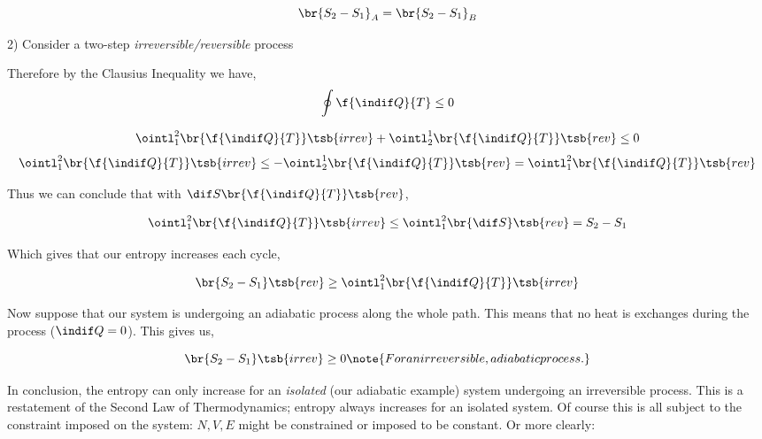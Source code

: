 \documentclass{article}
\begin{document}
\[ \br{S_2 - S_1}_A = \br{S_2 - S_1}_B \]

2) Consider a two-step \textit{irreversible/reversible} process

\begin{center}
\end{center}

Therefore by the Clausius Inequality we have,
\[ \oint \f{\indif Q}{T} \leq 0 \]

\[ \ointl_1^2 \br{\f{\indif Q}{T}}\tsb{irrev} + \ointl_2^1 \br{\f{\indif Q}{T}}\tsb{rev} \leq 0 \]
\[ \ointl_1^2 \br{\f{\indif Q}{T}}\tsb{irrev} \leq - \ointl_2^1 \br{\f{\indif Q}{T}}\tsb{rev} = \ointl_1^2 \br{\f{\indif Q}{T}}\tsb{rev} \]

Thus we can conclude that with $\dif S \br{\f{\indif Q}{T}}\tsb{rev}$,

\[ \ointl_1^2 \br{\f{\indif Q}{T}}\tsb{irrev} \leq \ointl_1^2 \br{\dif S}\tsb{rev} = S_2 - S_1 \]

Which gives that our entropy increases each cycle,

\[ \br{S_2 - S_1}\tsb{rev} \geq \ointl_1^2 \br{\f{\indif Q}{T}}\tsb{irrev} \]

Now suppose that our system is undergoing an adiabatic process along the whole path. This means that no heat is exchanges during the process ($\indif Q = 0$). This gives us,

\[ \br{S_2 - S_1}\tsb{irrev} \geq 0 \note{For an irreversible, adiabatic process.}\]

In conclusion, the entropy can only increase for an \textit{isolated} (our adiabatic example) system undergoing an irreversible process. This is a restatement of the Second Law of Thermodynamics; entropy always increases for an isolated system. Of course this is all subject to the constraint imposed on the system: $N, V, E$ might be constrained or imposed to be constant. Or more clearly: \\
\end{document}
